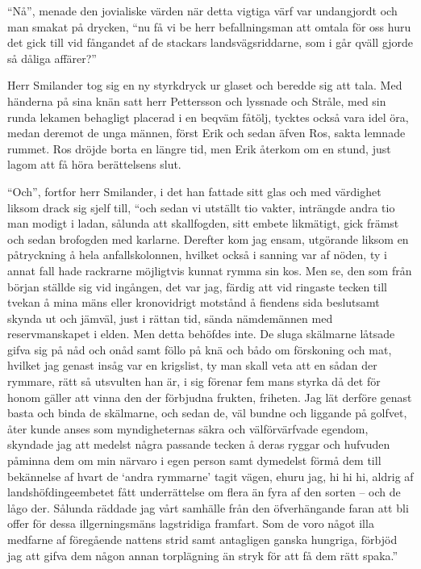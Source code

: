 ``Nå'', menade den jovialiske värden när detta vigtiga värf var
undangjordt och man smakat på drycken, ``nu få vi be herr befallningsman
att omtala för oss huru det gick till vid fångandet af de stackars
landsvägsriddarne, som i går qväll gjorde så dåliga affärer?''

Herr Smilander tog sig en ny styrkdryck ur glaset och beredde sig att
tala. Med händerna på sina knän satt herr Pettersson och lyssnade och
Stråle, med sin runda lekamen behagligt placerad i en beqväm fåtölj,
tycktes också vara idel öra, medan deremot de unga männen, först Erik
och sedan äfven Ros, sakta lemnade rummet. Ros dröjde borta en längre
tid, men Erik återkom om en stund, just lagom att få höra berättelsens
slut.

``Och'', fortfor herr Smilander, i det han fattade sitt glas och med
värdighet liksom drack sig sjelf till, ``och sedan vi utställt tio
vakter, inträngde andra tio man modigt i ladan, sålunda att skallfogden,
sitt embete likmätigt, gick främst och sedan brofogden med karlarne.
Derefter kom jag ensam, utgörande liksom en påtryckning å hela
anfallskolonnen, hvilket också i sanning var af nöden, ty i annat fall
hade rackrarne möjligtvis kunnat rymma sin kos. Men se, den som från
början ställde sig vid ingången, det var jag, färdig att vid ringaste
tecken till tvekan å mina mäns eller kronovidrigt motstånd å fiendens
sida beslutsamt skynda ut och jämväl, just i rättan tid, sända
nämdemännen med reservmanskapet i elden. Men detta behöfdes inte. De
sluga skälmarne låtsade gifva sig på nåd och onåd samt föllo på knä och
bådo om förskoning och mat, hvilket jag genast insåg var en krigslist,
ty man skall veta att en sådan der rymmare, rätt så utsvulten han är, i
sig förenar fem mans styrka då det för honom gäller att vinna den der
förbjudna frukten, friheten. Jag lät derföre genast basta och binda de
skälmarne, och sedan de, väl bundne och liggande på golfvet, åter kunde
anses som myndigheternas säkra och välförvärfvade egendom, skyndade jag
att medelst några passande tecken å deras ryggar och hufvuden påminna
dem om min närvaro i egen person samt dymedelst förmå dem till
bekännelse af hvart de `andra rymmarne' tagit vägen, ehuru jag, hi hi
hi, aldrig af landshöfdingeembetet fått underrättelse om flera än fyra
af den sorten -- och de lågo der. Sålunda räddade jag vårt samhälle från
den öfverhängande faran att bli offer för dessa illgerningsmäns
lagstridiga framfart. Som de voro något illa medfarne af föregående
nattens strid samt antagligen ganska hungriga, förbjöd jag att gifva dem
någon annan torplägning än stryk för att få dem rätt spaka.''

